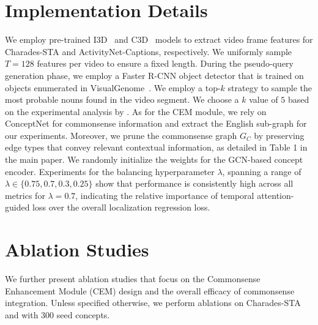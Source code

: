 \section{Implementation Details}
We employ pre-trained I3D~\cite{qian_locate_2022} and C3D~\cite{c3d} models to extract video frame features for Charades-STA and ActivityNet-Captions, respectively. We uniformly sample $T\!=
\!128$ features per video to ensure a fixed length. 
During the pseudo-query generation phase, we employ a Faster R-CNN object detector that is trained on objects enumerated in VisualGenome~\cite{krishna_visual_2017}. We employ a top-$k$ strategy to sample the most probable nouns found in the video segment. We choose a \(k\) value of $5$ based on the experimental analysis by \citet{nam_zero-shot_2021}. 
As for the CEM module, we rely on ConceptNet \cite{speer_conceptnet_2017} for commonsense information and extract the English sub-graph for our experiments. Moreover, we prune the commonsense graph \(G_{C}\) by preserving edge types that convey relevant contextual information, as detailed in Table 1 in the main paper.
We randomly initialize the weights for the GCN-based concept encoder.
Experiments for the balancing hyperparameter $\lambda$, spanning a range of $\lambda \in \{0.75, 0.7, 0.3, 0.25\}$ show that performance is consistently high across all metrics for $\lambda=0.7$, indicating the relative importance of temporal attention-guided loss over the overall localization regression loss.

\section{Ablation Studies}
\label{sec:ablations}
We further present ablation studies that focus on the Commonsense Enhancement Module (CEM) design and the overall efficacy of commonsense integration. Unless specified otherwise, we perform ablations on Charades-STA~\cite{Gao_2017_ICCV} and \modelname with 300 seed concepts.









